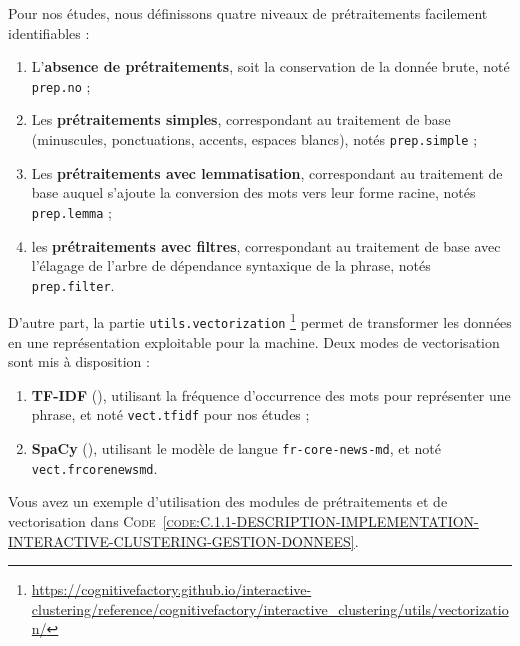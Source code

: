 	Pour nos études, nous définissons quatre niveaux de prétraitements facilement identifiables :
	\begin{enumerate}
		\item L'\textbf{absence de prétraitements}, soit la conservation de la donnée brute, noté \texttt{prep.no} ;
		\item Les \textbf{prétraitements simples}, correspondant au traitement de base (minuscules, ponctuations, accents, espaces blancs), notés \texttt{prep.simple} ; 
		\item Les \textbf{prétraitements avec lemmatisation}, correspondant au traitement de base auquel s'ajoute la conversion des mots vers leur forme racine, notés \texttt{prep.lemma} ;
		\item les \textbf{prétraitements avec filtres}, correspondant au traitement de base avec l'élagage de l'arbre de dépendance syntaxique de la phrase, notés \texttt{prep.filter}.
	\end{enumerate}
	
	
	D'autre part, la partie \texttt{utils.vectorization} \footnote{
		\url{https://cognitivefactory.github.io/interactive-clustering/reference/cognitivefactory/interactive_clustering/utils/vectorization/}
	} permet de transformer les données en une représentation exploitable pour la machine.
	Deux modes de vectorisation sont mis à disposition :
	\begin{enumerate}
		\item \textbf{TF-IDF} (\cite{ramos:2003:using-tfidf-determine}), utilisant la fréquence d'occurrence des mots pour représenter une phrase, et noté \texttt{vect.tfidf} pour nos études ;
		\item \textbf{SpaCy} (\cite{honnibal-montani:2017:spacy-natural-language}), utilisant le modèle de langue \texttt{fr-core-news-md}, et noté \texttt{vect.frcorenewsmd}.
	\end{enumerate}
	
	Vous avez un exemple d'utilisation des modules de prétraitements et de vectorisation dans \textsc{Code~\ref{code:C.1.1-DESCRIPTION-IMPLEMENTATION-INTERACTIVE-CLUSTERING-GESTION-DONNEES}}.
	

